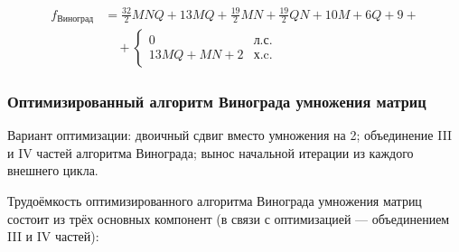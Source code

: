 \begin{equation}
\begin{aligned}
f_{\text{Виноград}} &= \frac{32}{2} MNQ + 13 MQ + \frac{19}{2} MN + \frac{19}{2} QN + 10 M + 6 Q + 9 + \\
&\quad + \begin{cases}
0 & \text{л.с.} \\
13 MQ + MN + 2 & \text{х.c.}
\end{cases}
\end{aligned}
\end{equation}

\subsubsection{Оптимизированный алгоритм Винограда умножения матриц}

\hspace{1.25cm}
Вариант оптимизации: двоичный сдвиг вместо умножения на 2; объединение III и IV частей алгоритма Винограда; вынос начальной итерации из каждого внешнего цикла.

Трудоёмкость оптимизированного алгоритма Винограда умножения матриц состоит из трёх основных компонент (в связи с оптимизацией --- объединением III и IV частей):

